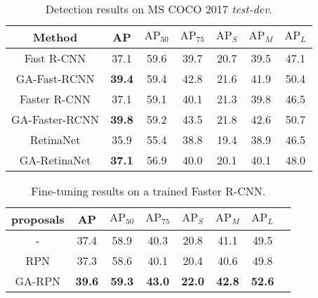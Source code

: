 \documentclass[10pt,twocolumn,letterpaper]{article}
\begin{document}
\begin{table}[t]
	\centering
	\caption{\small{Detection results on MS COCO 2017 \emph{test-dev}.}}
	\addtolength{\tabcolsep}{-2pt}
	\small{
		\begin{tabular}{*{7}{c}}
			\toprule
			Method         & AP            & $\text{AP}_{50}$ & $\text{AP}_{75}$ & $\text{AP}_{S}$ & $\text{AP}_{M}$ & $\text{AP}_{L}$ \\
			\midrule
			Fast R-CNN     & 37.1          & 59.6             & 39.7             & 20.7            & 39.5            & 47.1            \\
			GA-Fast-RCNN   & \textbf{39.4} & 59.4             & 42.8             & 21.6            & 41.9            & 50.4            \\
			\midrule
			Faster R-CNN   & 37.1          & 59.1             & 40.1             & 21.3            & 39.8            & 46.5            \\
			GA-Faster-RCNN & \textbf{39.8} & 59.2             & 43.5             & 21.8            & 42.6            & 50.7            \\
			\midrule
			RetinaNet      & 35.9          & 55.4             & 38.8             & 19.4            & 38.9            & 46.5            \\
			GA-RetinaNet   & \textbf{37.1} & 56.9             & 40.0             & 20.1            & 40.1            & 48.0            \\
			\bottomrule
		\end{tabular}
	}
	\vspace{-10pt}
	\label{tab:det-results}
\end{table}

\begin{table}[h]
	\centering
	\caption{\small{Fine-tuning results on a trained Faster R-CNN.}}
	\addtolength{\tabcolsep}{-2pt}
	\small{
		\begin{tabular}{*{8}{c}}
			\toprule
			proposals & AP            & $\text{AP}_{50}$ & $\text{AP}_{75}$ & $\text{AP}_{S}$ & $\text{AP}_{M}$ & $\text{AP}_{L}$ \\
			\midrule
			-         & 37.4          & 58.9             & 40.3             & 20.8            & 41.1            & 49.5            \\
			RPN       & 37.3          & 58.6             & 40.1             & 20.4            & 40.6            & 49.8            \\
			GA-RPN    & \textbf{39.6} & \textbf{59.3}    & \textbf{43.0}    & \textbf{22.0}   & \textbf{42.8}   & \textbf{52.6}   \\
			\bottomrule
		\end{tabular}
	}
	\label{tab:finetune}
	\vspace{-10pt}
\end{table}
\end{document}
